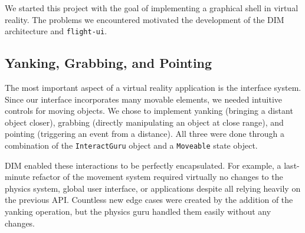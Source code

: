 \documentclass[conference,12pt]{IEEEtran}
\begin{document}
We started this project with the goal of implementing a graphical shell in
virtual reality. The problems we encountered motivated the development of the
DIM architecture and \texttt{flight-ui}.

\subsection{Yanking, Grabbing, and Pointing}

The most important aspect of a virtual reality application is the interface
system. Since our interface incorporates many movable elements, we needed
intuitive controls for moving objects. We chose to implement yanking (bringing a
distant object closer), grabbing (directly manipulating an object at close
range), and pointing (triggering an event from a distance). All three were done
through a combination of the \texttt{InteractGuru} object and a
\texttt{Moveable} state object.

DIM enabled these interactions to be perfectly encapsulated. For example, a
last-minute refactor of the movement system required virtually no changes to the
physics system, global user interface, or applications despite all relying
heavily on the previous API. Countless new edge cases were created by the
addition of the yanking operation, but the physics guru handled them easily
without any changes.
\end{document}
